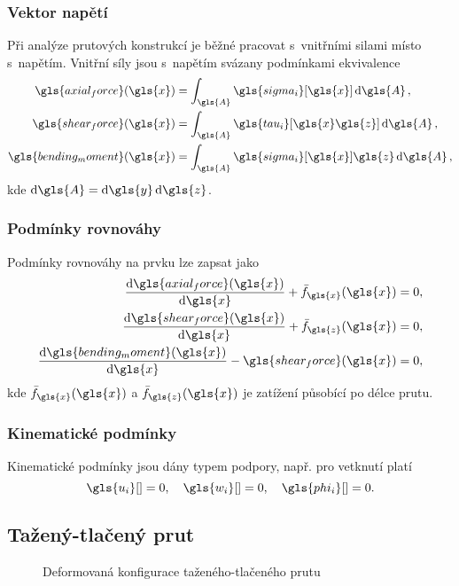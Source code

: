 \subsubsection*{Vektor napětí}

Při analýze prutových konstrukcí je běžné pracovat s~vnitřními silami místo s~napětím. Vnitřní síly jsou s~napětím svázany podmínkami ekvivalence
\begin{align}
    \gls{axial_force}(\gls{x}) &= \int_{\gls{A}} \gls{sigma_i}[\gls{x}] \dd{\gls{A}}, \label{eq:N}\\
    \gls{shear_force}(\gls{x}) &= \int_{\gls{A}} \gls{tau_i}[\gls{x}\gls{z}] \dd{\gls{A}}, \label{eq:V}\\
    \gls{bending_moment}(\gls{x}) &= \int_{\gls{A}} \gls{sigma_i}[\gls{x}] \gls{z} \dd{\gls{A}}, \label{eq:M}
\end{align}
kde $\dd{\gls{A}} = \dd{\gls{y}}\dd{\gls{z}}$.

\subsubsection*{Podmínky rovnováhy}
Podmínky rovnováhy na prvku lze zapsat jako
\begin{align}
    \dv{\gls{axial_force}(\gls{x})}{\gls{x}} + \bar{f}_{\gls{x}}(\gls{x}) &= 0, \\
    \dv{\gls{shear_force}(\gls{x})}{\gls{x}} + \bar{f}_{\gls{z}}(\gls{x}) &= 0, \label{eq:V_equilibrium}\\
    \dv{\gls{bending_moment}(\gls{x})}{\gls{x}} - \gls{shear_force}(\gls{x}) &= 0, \label{eq:M_equilibrium}
\end{align}
kde $\bar{f}_{\gls{x}}(\gls{x})$ a $\bar{f}_{\gls{z}}(\gls{x})$ je zatížení působící po délce prutu.

\subsubsection*{Kinematické podmínky}
Kinematické podmínky jsou dány typem podpory, např. pro vetknutí platí
\begin{equation}
    \gls{u_i}[ ] = 0, \quad \gls{w_i}[ ] = 0, \quad \gls{phi_i}[ ] = 0.
\end{equation}

\subsection{Tažený-tlačený prut}

\begin{figure}[H]
    
    \caption{Deformovaná konfigurace taženého-tlačeného prutu}
    \label{fig:deformed_bar}
\end{figure}

